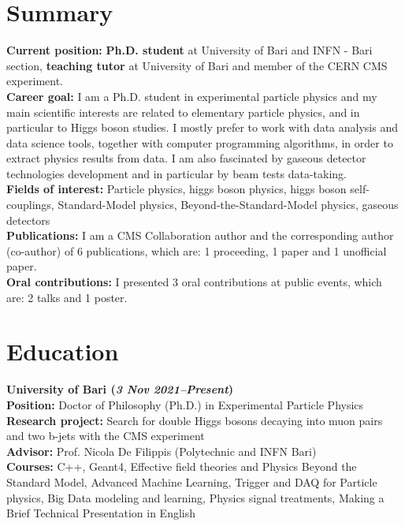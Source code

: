 \documentclass[11pt]{res}
\newcommand{\MarginText}[1]{\section{#1}\vspace{10pt}}
\begin{document}
\newcommand{\DOI}[1]{\href{https://doi.org/#1}{doi:#1}}
\begin{resume}
\MarginText{Summary}
\textbf{Current position:} \textbf{Ph.D. student} at University of Bari and INFN - Bari section, \textbf{teaching tutor} at University of Bari and member of the CERN CMS experiment.\\
\textbf{Career goal:} I am a Ph.D. student in experimental particle physics and my main scientific interests are related to elementary particle physics, and in particular to Higgs boson studies. I mostly prefer to work with data analysis and data science tools, together with computer programming algorithms, in order to extract physics results from data. I am also fascinated by gaseous detector technologies development and in particular by beam tests data-taking.\\
\textbf{Fields of interest:} Particle physics, higgs boson physics, higgs boson self-couplings, Standard-Model physics, Beyond-the-Standard-Model physics, gaseous detectors\\
\textbf{Publications:} I am a CMS Collaboration author and the corresponding author (co-author) of 6 publications, which are: 1 proceeding, 1 paper and 1 unofficial paper.\\
\textbf{Oral contributions:} I presented 3 oral contributions at public events, which are: 2 talks and 1 poster.\\

\MarginText{Education}

\textbf{University of Bari (\textit{3 Nov 2021--Present})}\\
\textbf{Position:} Doctor of Philosophy (Ph.D.) in Experimental Particle Physics\\
\textbf{Research project:}
Search for double Higgs bosons decaying into muon pairs and two b-jets with the CMS experiment\\
\textbf{Advisor:} Prof. Nicola De Filippis (Polytechnic and INFN Bari)\\
\textbf{Courses:} C++, Geant4, Effective field theories and Physics Beyond the Standard Model, Advanced Machine Learning, Trigger and DAQ for Particle physics, Big Data modeling and learning, Physics signal treatments, Making a Brief Technical Presentation in English


\end{resume}
\end{document}

